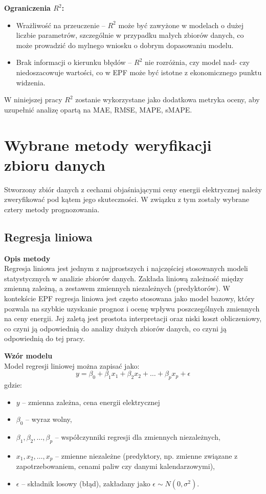 \textbf{Ograniczenia \( R^2 \):}
\begin{itemize}
    \item Wrażliwość na przeuczenie -- \( R^2 \) może być zawyżone w modelach o dużej liczbie parametrów, szczególnie w przypadku małych zbiorów danych, co może prowadzić do mylnego wniosku o dobrym dopasowaniu modelu.
    \item Brak informacji o kierunku błędów -- \( R^2 \) nie rozróżnia, czy model nad- czy niedoszacowuje wartości, co w EPF może być istotne z ekonomicznego punktu widzenia.
\end{itemize}

W niniejszej pracy \( R^2 \) zostanie wykorzystane jako dodatkowa metryka oceny, aby uzupełnić analizę opartą na MAE, RMSE, MAPE, sMAPE.

\section{Wybrane metody weryfikacji zbioru danych}
\label{sec:metody_weryfikacji_zbioru_danych}

Stworzony zbiór danych z cechami objaśniającymi ceny energii elektrycznej należy zweryfikować pod kątem jego skuteczności. W związku z tym zostały wybrane cztery metody prognozowania.

\subsection{Regresja liniowa}

\textbf{Opis metody} \\
Regresja liniowa jest jednym z najprostszych i najczęściej stosowanych modeli statystycznych w analizie zbiorów danych. Zakłada liniową zależność między zmienną zależną, a zestawem zmiennych niezależnych (predyktorów). W kontekście EPF regresja liniowa jest często stosowana jako model bazowy, który pozwala na szybkie uzyskanie prognoz i ocenę wpływu poszczególnych zmiennych na ceny energii. Jej zaletą jest prostota interpretacji oraz niski koszt obliczeniowy, co czyni ją odpowiednią do analizy dużych zbiorów danych, co czyni ją odpowiednią do tej pracy.

\textbf{Wzór modelu} \\
Model regresji liniowej można zapisać jako:
\begin{equation}
y = \beta_0 + \beta_1 x_1 + \beta_2 x_2 + \dots + \beta_p x_p + \epsilon
\end{equation}
gdzie:
\begin{itemize}
    \item \( y \) -- zmienna zależna, cena energii elektrycznej
    \item \( \beta_0 \) -- wyraz wolny,
    \item \( \beta_1, \beta_2, \dots, \beta_p \) -- współczynniki regresji dla zmiennych niezależnych,
    \item \( x_1, x_2, \dots, x_p \) -- zmienne niezależne (predyktory, np. zmienne związane z zapotrzebowaniem, cenami paliw czy danymi kalendarzowymi),
    \item \( \epsilon \) -- składnik losowy (błąd), zakładany jako \( \epsilon \sim N(0, \sigma^2) \).
\end{itemize}

